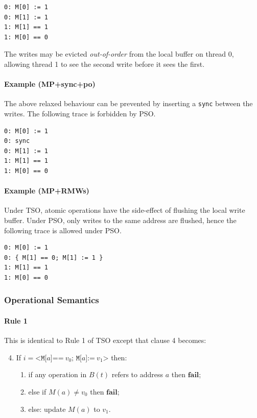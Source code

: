 \documentclass[11pt]{article}
\begin{document}
\begin{verbatim}
0: M[0] := 1
0: M[1] := 1
1: M[1] == 1
1: M[0] == 0
\end{verbatim}

\noindent The writes may be evicted \emph{out-of-order} from the local
buffer on thread 0, allowing thread 1 to see the second write before
it sees the first.

\paragraph{Example (MP+sync+po)} The above relaxed behaviour can be
prevented by inserting a \verb!sync! between the writes.  The
following trace is forbidden by PSO.

\begin{verbatim}
0: M[0] := 1
0: sync
0: M[1] := 1
1: M[1] == 1
1: M[0] == 0
\end{verbatim}

\paragraph{Example (MP+RMWs)}  Under TSO, atomic operations have the
side-effect of flushing the local write buffer.  Under PSO, only
writes to the same address are flushed, hence the following trace
is allowed under PSO.

\begin{verbatim}
0: M[0] := 1
0: { M[1] == 0; M[1] := 1 }
1: M[1] == 1
1: M[0] == 0
\end{verbatim}

\subsubsection*{Operational Semantics}

\paragraph{Rule 1}

This is identical to Rule 1 of TSO except that clause 4 becomes:

\begin{enumerate}
\setcounter{enumi}{3}
\item
     If $i = \texttt{<M[}a\texttt{]==}~v_0\texttt{; M[}a\texttt{]:=}~v_1
     \texttt{>}$ then:
\begin{enumerate}[i]

\item
           if any operation in $B(t)$ refers to address $a$ then
           $\textbf{fail}$;

\item
           else if $M(a) \neq v_0$ then $\textbf{fail}$;

\item
           else: update $M(a)$ to $v_1$.
\end{enumerate}
\end{enumerate}
\end{document}
